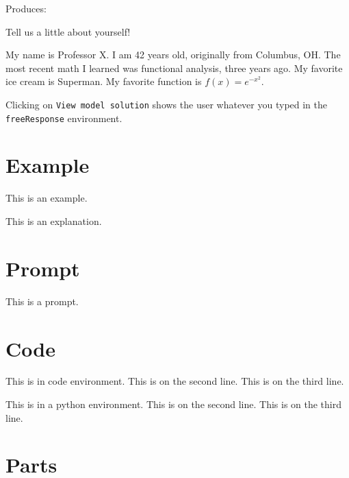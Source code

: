 \documentclass{ximera}
\begin{document}
Produces:

  \begin{question}
    Tell us a little about yourself!
    \begin{freeResponse}
        My name is Professor X. I am 42 years old, originally from Columbus, OH. The most recent 
        math I learned was functional analysis, three years ago. My favorite ice cream is Superman. 
        My favorite function is $f(x) = e^{-x^2}.$
    \end{freeResponse}
  \end{question}

\begin{remark}
Clicking on \verb!View model solution! shows the user
whatever you typed in the  \verb!freeResponse! environment.
\end{remark}

\section{Example}

\begin{example}
This is an example.
\end{example}
\begin{explanation}
This is an explanation.
\end{explanation}

\section{Prompt}

\begin{prompt}
This is a prompt.
\end{prompt}

\section{Code}

\begin{code}
This is in code environment.
This is on the second line.
This is on the third line.
\end{code}

\begin{python}
This is in a python environment.
This is on the second line.
This is on the third line.
\end{python}

\section{Parts}
\end{document}
